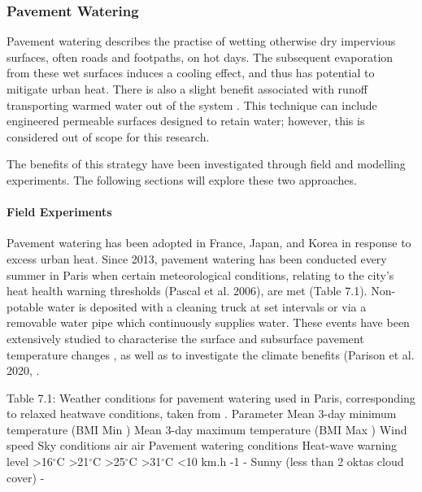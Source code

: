 \documentclass[final,3p,times,authoryear]{elsarticle}
\begin{document}
\subsubsection{Pavement Watering}\label{sec:appendix7.1.4_}

Pavement watering describes the practise of wetting otherwise dry impervious surfaces,
often roads and footpaths, on hot days. The subsequent evaporation from these wet
surfaces induces a cooling effect, and thus has potential to mitigate urban heat. There is
also a slight benefit associated with runoff transporting warmed water out of the system
\citep{Hendel2020}. This technique can include engineered permeable surfaces
designed to retain water; however, this is considered out of scope for this research. 

The benefits of this strategy have been investigated through field and modelling
experiments. The following sections will explore these two approaches.

\paragraph{Field Experiments}\label{sec:appendix7.1.4.1}

Pavement watering has been adopted in France, Japan, and Korea in response to excess
urban heat.
Since 2013, pavement watering has been conducted every summer in Paris when certain
meteorological conditions, relating to the city's heat health warning thresholds (Pascal et
al. 2006), are met (Table 7.1). Non-potable water is deposited with a cleaning truck at
set intervals or via a removable water pipe which continuously supplies water. These events have been extensively studied to characterise the surface and subsurface
pavement temperature changes \cite{Hendel2015,Hendel2015a,Hendel2015b,Hendel2014}, as well as to investigate the climate benefits (Parison et al. 2020, \cite{Hendel2016}.


Table 7.1: Weather conditions for pavement watering used in Paris, corresponding to relaxed heatwave
conditions, taken from \cite{Hendel2015a}.
Parameter
Mean 3-day minimum
temperature (BMI Min )
Mean 3-day maximum
temperature (BMI Max )
Wind speed
Sky conditions
air
air
Pavement watering
conditions Heat-wave
warning level
>16$^{\circ}$C >21$^{\circ}$C
>25$^{\circ}$C >31$^{\circ}$C
<10 km.h -1 -
Sunny (less than 2 oktas
cloud cover) -
\end{document}
